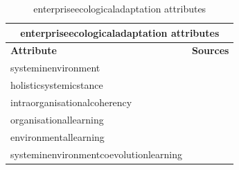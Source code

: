 \begin{table}[H]
	\begin{center}
		\begin{tabular}{@{}ll@{}}
				\multicolumn{2}{c}{\textbf{\Gls{enterpriseecologicaladaptation} \glspl{attribute}}} \\%
				\toprule %
				\textbf{Attribute} & \textbf{Sources} \\%
				\midrule%
				\Gls{systeminenvironment} & \parencite{Lapalme2012} \\%
				\Gls{holisticsystemicstance} & \parencite{Lapalme2012} \\%
				\Gls{intraorganisationalcoherency} & \parencite{Lapalme2012} \\%
				\Gls{organisationallearning} & \parencite{Lapalme2012} \\%
				\Gls{environmentallearning} & \parencite{Lapalme2012} \\%
				\Gls{systeminenvironmentcoevolutionlearning} & \parencite{Lapalme2012} \\%
				\bottomrule%
			\end{tabular}
		\caption[\Gls{enterpriseecologicaladaptation} \glspl{attribute}]{\Gls{enterpriseecologicaladaptation} \glspl{attribute}}
		\label{tab:attributesofeea}
	\end{center}
\end{table}
